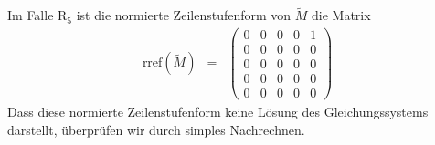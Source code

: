 \documentclass[a4paper,oneside, 11pt, openany%
]{article}
\theoremstyle{custom}
\theoremstyle{custom}
\begin{document}
Im Falle $\text{R}_{5}$ ist die normierte Zeilenstufenform von $\tilde{M}$ die Matrix
\begin{equation*}\label{eqn:rref_r5}
	\begin{alignedat}{-1}
		\text{rref}(\tilde{M}) &=& 
		\left( \begin{array}{ccccc}				
			0&0&0&0&1\\
			0&0&0&0&0\\
			0&0&0&0&0\\
			0&0&0&0&0\\
			0&0&0&0&0
		\end{array}
		\right)
	\end{alignedat}
\end{equation*}
Dass diese normierte Zeilenstufenform keine Lösung des Gleichungssystems darstellt, überprüfen wir durch simples Nachrechnen.
\end{document}
